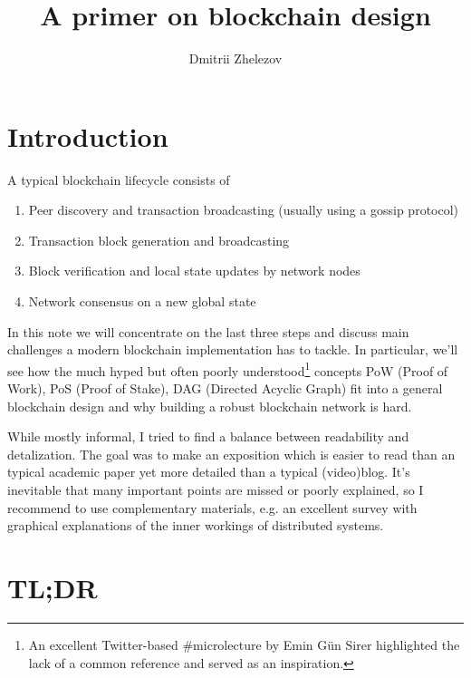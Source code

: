 \documentclass[a4paper]{article}
\title{A primer on blockchain design}
\author{Dmitrii Zhelezov}
\begin{document}
\maketitle

\section{Introduction}
A typical blockchain lifecycle consists of
\begin{enumerate}
\item Peer discovery and transaction broadcasting (usually using a gossip protocol)
\item Transaction block generation and broadcasting
\item Block verification and local state updates by network nodes
\item Network consensus on a new global state
\end{enumerate}

In this note we will concentrate on the last three steps and discuss main challenges a modern blockchain implementation has to tackle. In particular, we'll see how the much hyped but often poorly understood\footnote{An excellent Twitter-based \#microlecture \cite{microlecture} by Emin G\"un Sirer highlighted the lack of a common reference and served as an inspiration.}
concepts  PoW (Proof of Work), PoS (Proof of Stake), DAG (Directed Acyclic Graph) fit into a general blockchain design and why building a robust blockchain network is hard. 
  
  While mostly informal, I tried to find a balance between readability and detalization. The goal was to make an exposition which is easier to read than an typical academic paper yet more detailed than a typical (video)blog. It's inevitable that many important points are missed or poorly explained, so I recommend to use complementary materials, e.g. an excellent survey \cite{DLT} with graphical explanations of the inner workings of distributed systems.


\section{TL;DR}
\end{document}
